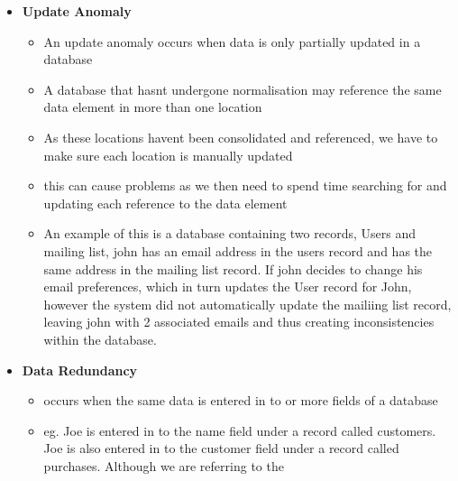 \documentclass[12pt, a4, twoside]{article}
\begin{document}
\begin{center}
\begin{itemize}
\begin{itemize}
\begin{itemize}
      \end{itemize}
      \item \textbf{Update Anomaly}
      \begin{itemize}
        \item An update anomaly occurs when data is only partially updated in a database
        \item A database that hasnt undergone normalisation may reference the same data element in more than one location 
        \item As these locations havent been consolidated and referenced, we have to make sure each location is manually updated 
        \item this can cause problems as we then need to spend time searching for and updating each reference to the data element 
        \item An example of this is a database containing two records, Users and mailing list, john has an email address in the users record and has the same address in the mailing list record. If john decides to change his email preferences, which in turn updates the User record for John, however the system did not automatically update the mailiing list record, leaving john with 2 associated emails and thus creating inconsistencies within the database. 
      \end{itemize}
      \item \textbf{Data Redundancy}
      \begin{itemize}
        \item occurs when the same data is entered in to or more fields of a database 
        \item eg. Joe is entered in to the name field under a record called customers. Joe is also entered in to the customer field under a record called purchases. 
        Although we are referring to the 


\end{itemize}
\end{itemize}
\end{itemize}
\end{center}
\end{document}
